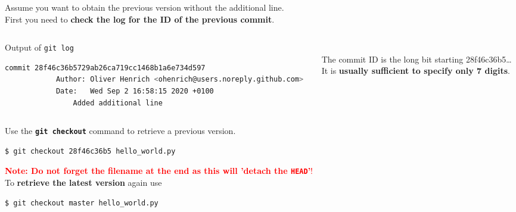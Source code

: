 \begin{frame}[fragile]
\emptyframetitle

  Assume you want to obtain the previous version without the additional line.\\[0.2cm]

  First you need to \textbf{check the log for the ID of the previous commit}.

  \vspace*{-0.2cm}
  \begin{columns}
      \begin{column}{0.55\textwidth}
        \begin{block}{Output of \texttt{git log}}
          \begin{lstlisting}[language=bash, basicstyle=\tiny\ttfamily]
            commit 28f46c36b5729ab26ca719cc1468b1a6e734d597
            Author: Oliver Henrich <ohenrich@users.noreply.github.com>
            Date:   Wed Sep 2 16:58:15 2020 +0100
                Added additional line
          \end{lstlisting}
        \end{block}
      \end{column}
      \begin{column}{0.425\textwidth}
        \vspace*{0.5cm}\\
        The commit ID is the long bit starting 28f46c36b5\dots\\[0.25cm]
         It is \textbf{usually sufficient to specify only 7 digits}.
      \end{column}
    \end{columns}

  \vspace*{0.2cm}
  Use the \texttt{\textbf{git checkout}} command to retrieve a previous version.

  \begin{lstlisting}[language=bash]
    $ git checkout 28f46c36b5 hello_world.py
  \end{lstlisting}

  \textcolor{red}{\textbf{Note: Do not forget the filename at the end as this will 'detach the \texttt{HEAD}'}!}\\[0.2cm]

  To \textbf{retrieve the latest version} again use 

  \begin{lstlisting}[language=bash]
    $ git checkout master hello_world.py
  \end{lstlisting}


\end{frame}


